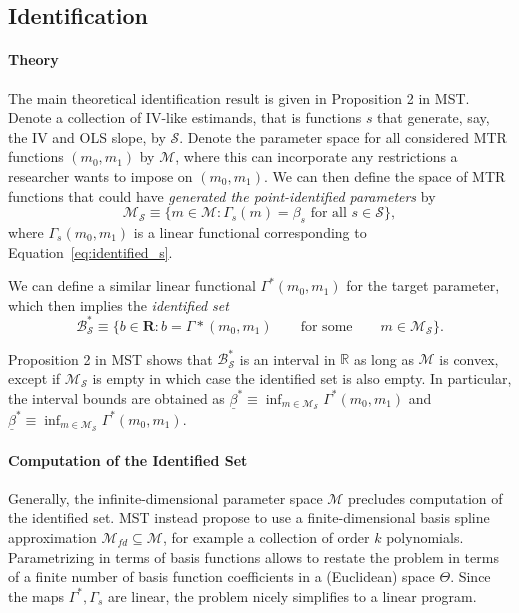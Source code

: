 \documentclass[12pt,a4paper,english]{article} %
\numberwithin{equation}{section}
\theoremstyle{definition}
\theoremstyle{remark}
\theoremstyle{plain}
\begin{document}
\subsection{Identification}
\paragraph{Theory}
The main theoretical identification result is given in Proposition 2 in MST.\@
Denote a collection of IV-like estimands, that is functions $s$ that generate, say, the IV and OLS slope, by $\mathcal{S}$.
Denote the parameter space for all considered MTR functions $(m_0, m_1)$ by $\mathcal{M}$, where this can incorporate any restrictions a researcher wants to impose on $(m_0, m_1)$.
We can then define the space of MTR functions that could have \textit{generated the point-identified parameters} by
\begin{equation*}
  \mathcal{M}_{\mathcal{S}} \equiv \{m\in \mathcal{M}: \Gamma_s(m) = \beta_s \text{ for all } s\in\mathcal{S}\},
\end{equation*}
where $\Gamma_s(m_0, m_1)$ is a linear functional corresponding to Equation~\ref{eq:identified_s}.

We can define a similar linear functional $\Gamma^*(m_0, m_1)$ for the target parameter, which then implies the \textit{identified set}
\begin{equation}\label{eq:identified_set}
  \mathcal{B}^*_\mathcal{S} \equiv \{b\in\mathbf{R}: b = \Gamma*(m_0, m_1) \qquad \text{for some} \qquad m \in \mathcal{M}_\mathcal{S}\}.
\end{equation}

Proposition 2 in MST shows that $\mathcal{B}_\mathcal{S}^*$ is an interval in $\mathbb{R}$ as long as $\mathcal{M}$ is convex, except if $\mathcal{M}_\mathcal{S}$ is empty in which case the identified set is also empty.
In particular, the interval bounds are obtained as $\underline{\beta}^* \equiv \inf_{m\in\mathcal{M}_\mathcal{S}}\Gamma^*(m_0, m_1)$ and $\underline{\beta}^* \equiv \inf_{m\in\mathcal{M}_\mathcal{S}}\Gamma^*(m_0, m_1)$.


\paragraph{Computation of the Identified Set}
Generally, the infinite-dimensional parameter space $\mathcal{M}$ precludes computation of the identified set.
MST instead propose to use a finite-dimensional basis spline approximation $\mathcal{M}_{fd}\subseteq{\mathcal{M}}$, for example a collection of order $k$ polynomials.
Parametrizing in terms of basis functions allows to restate the problem in terms of a finite number of basis function coefficients in a (Euclidean) space $\Theta$.
Since the maps $\Gamma^*, \Gamma_s$ are linear, the problem nicely simplifies to a linear program.
\end{document}
